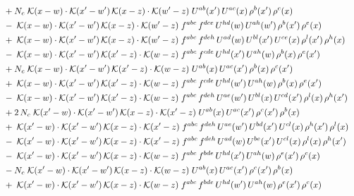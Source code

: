 \documentclass[9pt]{article}
\begin{document}
\begin{align}
&\quad +N_c\;\mathcal{K}(x-w)\cdot\mathcal{K}(x'-w')\,\mathcal{K}(x-z)\cdot\mathcal{K}(w'-z)\;U^{ab}(x')\,U^{ac}(x)\,\rho^{b}(x')\,\rho^{c}(x)\notag\\
&\quad -\;\mathcal{K}(x-w)\cdot\mathcal{K}(x'-w')\,\mathcal{K}(x-z)\cdot\mathcal{K}(w'-z)\;f^{abc}\,f^{dce}\,U^{hd}(w)\,U^{ah}(w')\,\rho^{b}(x')\,\rho^{e}(x)\notag\\
&\quad +\;\mathcal{K}(x-w)\cdot\mathcal{K}(x'-w')\,\mathcal{K}(x-z)\cdot\mathcal{K}(w'-z)\;f^{abc}\,f^{deh}\,U^{ad}(w)\,U^{bl}(x')\,U^{ce}(x)\,\rho^{l}(x')\,\rho^{h}(x)\notag\\
&\quad -\;\mathcal{K}(x-w)\cdot\mathcal{K}(x'-w')\,\mathcal{K}(x'-z)\cdot\mathcal{K}(w-z)\;f^{abc}\,f^{cde}\,U^{hd}(x')\,U^{ah}(w)\,\rho^{b}(x)\,\rho^{e}(x')\notag\\
&\quad +N_c\;\mathcal{K}(x-w)\cdot\mathcal{K}(x'-w')\,\mathcal{K}(x'-z)\cdot\mathcal{K}(w-z)\;U^{ab}(x)\,U^{ac}(x')\,\rho^{b}(x)\,\rho^{c}(x')\notag\\
&\quad +\;\mathcal{K}(x-w)\cdot\mathcal{K}(x'-w')\,\mathcal{K}(x'-z)\cdot\mathcal{K}(w-z)\;f^{abc}\,f^{cde}\,U^{hd}(w')\,U^{ah}(w)\,\rho^{b}(x)\,\rho^{e}(x')\notag\\
&\quad -\;\mathcal{K}(x-w)\cdot\mathcal{K}(x'-w')\,\mathcal{K}(x'-z)\cdot\mathcal{K}(w-z)\;f^{abc}\,f^{deh}\,U^{ae}(w')\,U^{bl}(x)\,U^{cd}(x')\,\rho^{l}(x)\,\rho^{h}(x')\notag\\
&\quad +2\,N_c\;\mathcal{K}(x'-w)\cdot\mathcal{K}(x'-w')\,\mathcal{K}(x-z)\cdot\mathcal{K}(x'-z)\;U^{ab}(x)\,U^{ac}(x')\,\rho^{c}(x')\,\rho^{b}(x)\notag\\
&\quad +\;\mathcal{K}(x'-w)\cdot\mathcal{K}(x'-w')\,\mathcal{K}(x-z)\cdot\mathcal{K}(x'-z)\;f^{abc}\,f^{deh}\,U^{ae}(w')\,U^{bd}(x')\,U^{cl}(x)\,\rho^{h}(x')\,\rho^{l}(x)\notag\\
&\quad -\;\mathcal{K}(x'-w)\cdot\mathcal{K}(x'-w')\,\mathcal{K}(x-z)\cdot\mathcal{K}(x'-z)\;f^{abc}\,f^{deh}\,U^{ad}(w)\,U^{be}(x')\,U^{cl}(x)\,\rho^{l}(x)\,\rho^{h}(x')\notag\\
&\quad -\;\mathcal{K}(x'-w)\cdot\mathcal{K}(x'-w')\,\mathcal{K}(x-z)\cdot\mathcal{K}(w-z)\;f^{abc}\,f^{bde}\,U^{hd}(x')\,U^{ah}(w)\,\rho^{e}(x')\,\rho^{c}(x)\notag\\
&\quad -N_c\;\mathcal{K}(x'-w)\cdot\mathcal{K}(x'-w')\,\mathcal{K}(x-z)\cdot\mathcal{K}(w-z)\;U^{ab}(x)\,U^{ac}(x')\,\rho^{c}(x')\,\rho^{b}(x)\notag\\
&\quad +\;\mathcal{K}(x'-w)\cdot\mathcal{K}(x'-w')\,\mathcal{K}(x-z)\cdot\mathcal{K}(w-z)\;f^{abc}\,f^{bde}\,U^{hd}(w')\,U^{ah}(w)\,\rho^{e}(x')\,\rho^{c}(x)\notag\\

\end{align}
\end{document}
